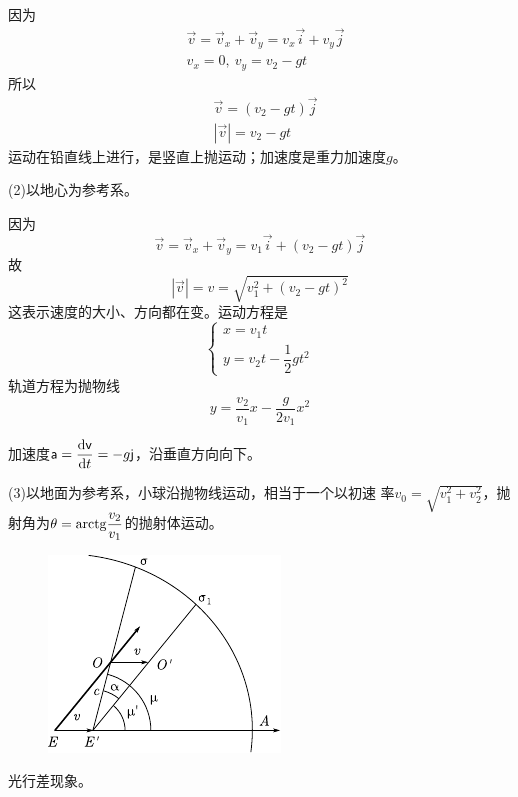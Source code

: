 因为\vspace{-1em}
\begin{align*}
    &\vec{v}=\vec{v}_x+\vec{v}_y=v_x\vec{i}+v_y\vec{j} \\
    &v_x=0,~ v_y=v_2-gt
\end{align*}
所以\vspace{-1em}
\begin{align*}
    &\vec{v}=(v_2-gt)\vec{j} \\
    &|\vec{v}|=v_2-gt
\end{align*}
运动在铅直线上进行，是竖直上抛运动；加速度是重力加速度$g$。

(2)以地心为参考系。

因为\vspace{-1em}
\begin{equation*}
    \vec{v}=\vec{v}_x+\vec{v}_y=v_1\vec{i}+(v_2-gt)\vec{j}
\end{equation*}
故\vspace{-1em}
\begin{equation*}
        |\vec{v}|=v=\sqrt{v_1^2+(v_2-gt)^2}
\end{equation*}
这表示速度的大小、方向都在变。运动方程是
\begin{equation*}
    \left\{\begin{array}{l}
        x=v_1t \\
        y=v_2t-\dfrac{1}{2}gt^2
    \end{array}\right.
\end{equation*}
轨道方程为抛物线
\begin{equation*}
    y=\frac{v_2}{v_1}x-\frac{g}{2v_1}x^2
\end{equation*}

\noindent 加速度${\mathsf{a}}=\dfrac{{\rm d} {\mathsf{v}}}{{\rm d} t}=-g{\mathsf{j}}$，沿垂直方向向下。

(3)以地面为参考系，小球沿抛物线运动，相当于一个以初速
率$\displaystyle v_0=\sqrt{v_1^2+v_2^2}$，抛射角为$\theta={\rm arctg}\dfrac{v_2}{v_1}$的抛射体运动。

\begin{figure}
    \vspace{1em}
    \centering
    \includegraphics{figure/fig02.09}
    \caption{}
    \label{fig:02.09}
\end{figure}
\example 光行差现象。

